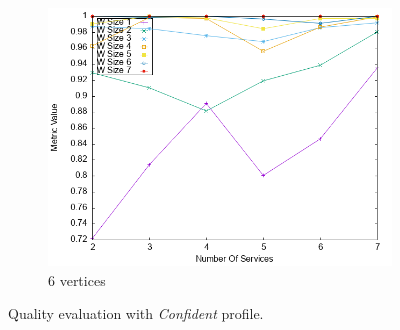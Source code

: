 \begin{figure}[ht]
\begin{subfigure}{0.33\textwidth}
    \includegraphics[width=\textwidth]{Images/graphs/newwindow_quality_performance_diff_perce_n7_s7_50_89_n7}
    \caption{6 vertices}
    \label{fig:quality_window_good_7n}
  \end{subfigure}
  \caption{ Quality evaluation with \textit{Confident} profile.}
  \label{fig:quality_window_good}
\end{figure}


